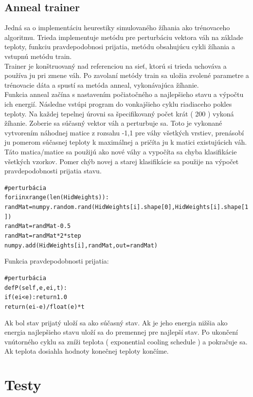 \documentclass[11pt,a4paper]{article}
\begin{document}
\subsection{Anneal trainer}
Jedná sa o implementáciu heurestiky simulovaného žíhania ako trénovaceho algoritmu. Trieda implementuje metódu pre perturbáciu vektora váh na základe teploty, funkciu pravdepodobnosi prijatia, metódu obsahujúcu cykli žíhania a vstupnú metódu train.\\
Trainer je konštruovaný nad referenciou na sieť, ktorú si trieda uchováva a používa ju pri zmene váh. Po zavolaní metódy train sa uložia zvolené parametre a trénovacie dáta a spustí sa metóda anneal, vykonávajúca žíhanie.\\
Funkcia anneal začína s nastavením počiatočného a najlepšieho stavu a výpočtu ich energií. Následne vstúpi program do vonkajšieho cyklu riadiaceho pokles teploty. Na každej tepelnej úrovni sa špecifikovaný počet krát ( 200 ) vykoná žíhanie. Zoberie sa súčasný vektor váh a perturbuje sa. Toto je vykonané vytvorením náhodnej matice z rozsahu -1,1 pre váhy všetkých vrstiev, prenásobí ju pomerom súčasnej teploty k maximálnej a pričíta ju k matici existujúcich váh. Táto matica/matice sa použijú ako nové váhy a vypočíta sa chyba klasifikácie všetkých vzorkov. Pomer chýb novej a starej klasifikácie sa použije na výpočet pravdepodobnosti prijatia stavu.
\begin{alltt}
\begin{small}
\# perturbácia
for i in xrange(len(HidWeights)):
	randMat = numpy.random.rand(HidWeights[i].shape[0], HidWeights[i].shape[1])
	randMat = randMat - 0.5
	randMat = randMat * 2 * step
	numpy.add(HidWeights[i], randMat, out=randMat)
\end{small}     
\end{alltt}
Funkcia pravdepodobnosti prijatia:
\begin{alltt}
\begin{small}
\# perturbácia
def P(self, e, ei, t):
	if ( ei < e ): return 1.0
	return (ei-e)/float(e)*t   
\end{small}
\end{alltt}
Ak bol stav prijatý uloží sa ako súčasný stav. Ak je jeho energia nižšia ako energia najlepšieho stavu uloží sa do premennej pre najlepší stav.
Po ukončení vnútorného cyklu sa zníži teplota ( exponential cooling schedule ) a pokračuje sa. Ak teplota dosiahla hodnoty konečnej teploty končíme.
\newpage
\section{Testy}
\end{document}

